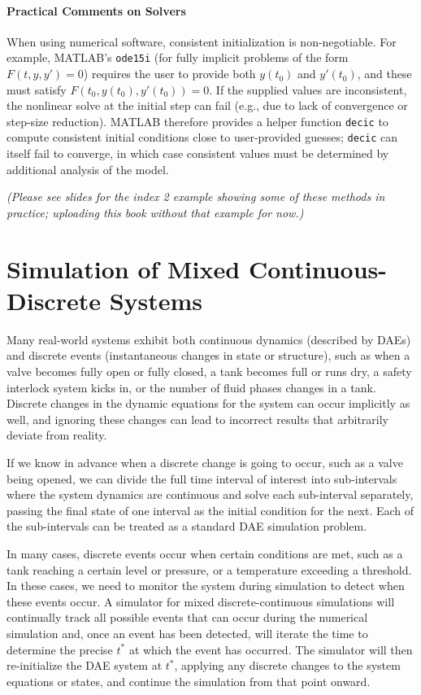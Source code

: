 \paragraph*{Practical Comments on Solvers}

When using numerical software, consistent initialization is non-negotiable. For example, MATLAB's \texttt{ode15i} (for fully implicit problems of the form $F(t,y,y')=0$) requires the user to provide both $y(t_0)$ and $y'(t_0)$, and these must satisfy $F(t_0,y(t_0),y'(t_0))=0$. If the supplied values are inconsistent, the nonlinear solve at the initial step can fail (e.g., due to lack of convergence or step-size reduction). MATLAB therefore provides a helper function \texttt{decic} to compute consistent initial conditions close to user-provided guesses; \texttt{decic} can itself fail to converge, in which case consistent values must be determined by additional analysis of the model.

\emph{(Please see slides for the index 2 example showing some of these methods in practice; uploading this book without that example for now.)} %

\section{Simulation of Mixed Continuous-Discrete Systems}
Many real-world systems exhibit both continuous dynamics (described by DAEs) and discrete events (instantaneous changes in state or structure), such as when a valve becomes fully open or fully closed, a tank becomes full or runs dry, a safety interlock system kicks in, or the number of fluid phases changes in a tank. Discrete changes in the dynamic equations for the system can occur implicitly as well, and ignoring these changes can lead to incorrect results that arbitrarily deviate from reality. 

If we know in advance when a discrete change is going to occur, such as a valve being opened, we can divide the full time interval of interest into sub-intervals where the system dynamics are continuous and solve each sub-interval separately, passing the final state of one interval as the initial condition for the next. Each of the sub-intervals can be treated as a standard DAE simulation problem. 

In many cases, discrete events occur when certain conditions are met, such as a tank reaching a certain level or pressure, or a temperature exceeding a threshold. In these cases, we need to monitor the system during simulation to detect when these events occur. A simulator for mixed discrete-continuous simulations will continually track all possible events that can occur during the numerical simulation and, once an event has been detected, will iterate the time to determine the precise $t^*$ at which the event has occurred. The simulator will then re-initialize the DAE system at $t^*$, applying any discrete changes to the system equations or states, and continue the simulation from that point onward.


